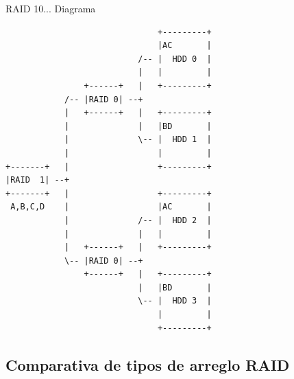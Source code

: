 \begin{itemize}
RAID 10... Diagrama \cite{9b286bf9442c2cf4d1e02ddf7322c92b}
{
\scriptsize
\linespread{1}
\begin{verbatim}
                               +---------+
                               |AC       |
                           /-- |  HDD 0  |
                           |   |         |
                +------+   |   +---------+
            /-- |RAID 0| --+
            |   +------+   |   +---------+
            |              |   |BD       |
            |              \-- |  HDD 1  |
            |                  |         |
+-------+   |                  +---------+
|RAID  1| --+
+-------+   |                  +---------+
 A,B,C,D    |                  |AC       |
            |              /-- |  HDD 2  |
            |              |   |         |
            |   +------+   |   +---------+
            \-- |RAID 0| --+
                +------+   |   +---------+
                           |   |BD       |
                           \-- |  HDD 3  |
                               |         |
                               +---------+
\end{verbatim}
}
  
\end{itemize}

      \subsection {Comparativa de tipos de arreglo RAID}

